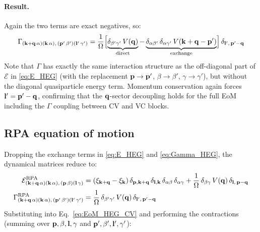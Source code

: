 \documentclass[11pt,letterpaper]{article}
\theoremstyle{definition}
\theoremstyle{plain}
\theoremstyle{remark}
\begin{document}
\paragraph{Result.} Again the two terms are exact negatives, so:
\begin{align}
    \Gamma_{(\vb{k}+\vb{q}\,\alpha)(\vb{k}\,\alpha),\,(\vb{p}'\,\beta')(\vb{l}'\,\gamma')} = \frac{1}{\Omega}\Bigl[\underbrace{\delta_{\beta'\gamma'}\,V(\vb{q})}_{\text{direct}} - \underbrace{\delta_{\alpha\beta'}\,\delta_{\alpha\gamma'}\,V(\vb{k}+\vb{q}-\vb{p}')}_{\text{exchange}}\Bigr]\,\delta_{\vb{l}',\,\vb{p}'-\vb{q}} \label{eq:Gamma_HEG}
\end{align}
Note that $\Gamma$ has exactly the same interaction structure as the off-diagonal part of $\mathcal{E}$ in \eqref{eq:E_HEG} (with the replacement $\vb{p} \to \vb{p}'$, $\beta \to \beta'$, $\gamma \to \gamma'$), but without the diagonal quasiparticle energy term. Momentum conservation again forces $\vb{l}' = \vb{p}' - \vb{q}$, confirming that the $\vb{q}$-sector decoupling holds for the full EoM including the $\Gamma$ coupling between CV and VC blocks.

\subsection{RPA equation of motion}
Dropping the exchange terms in \eqref{eq:E_HEG} and \eqref{eq:Gamma_HEG}, the dynamical matrices reduce to:
\begin{align}
    \mathcal{E}^{\mathrm{RPA}}_{(\vb{k}+\vb{q}\,\alpha)(\vb{k}\,\alpha),\,(\vb{p}\,\beta)(\vb{l}\,\gamma)} &= (\xi_{\vb{k}+\vb{q}} - \xi_{\vb{k}})\,\delta_{\vb{p},\vb{k}+\vb{q}}\,\delta_{\vb{l},\vb{k}}\,\delta_{\alpha\beta}\,\delta_{\alpha\gamma} + \frac{1}{\Omega}\,\delta_{\beta\gamma}\,V(\vb{q})\,\delta_{\vb{l},\,\vb{p}-\vb{q}} \\
    \Gamma^{\mathrm{RPA}}_{(\vb{k}+\vb{q}\,\alpha)(\vb{k}\,\alpha),\,(\vb{p}'\,\beta')(\vb{l}'\,\gamma')} &= \frac{1}{\Omega}\,\delta_{\beta'\gamma'}\,V(\vb{q})\,\delta_{\vb{l}',\,\vb{p}'-\vb{q}}
\end{align}
Substituting into Eq.~\eqref{eq:EoM_HEG_CV} and performing the contractions (summing over $\vb{p},\beta,\vb{l},\gamma$ and $\vb{p}',\beta',\vb{l}',\gamma'$):
\end{document}
